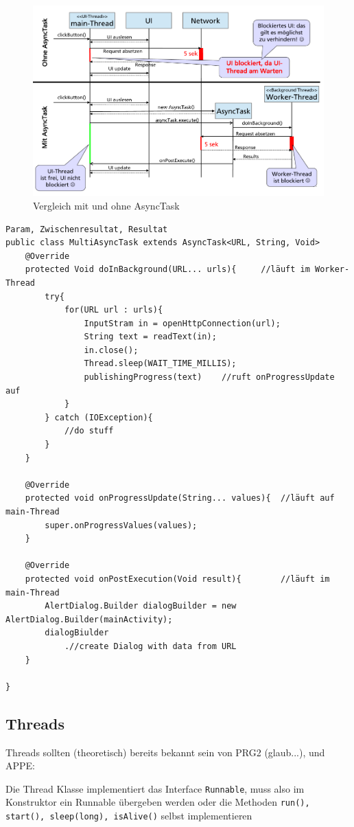 \documentclass[a4paper, 11pt]{article}
\newcommand{\code}[1]{\texttt{#1}}
\begin{document}
\begin{figure}[htb]
	\centering
	\includegraphics[keepaspectratio=true,height=15\baselineskip]{asynctask}
	\caption{Vergleich mit und ohne AsyncTask}
	\label{fig:asynctask}
\end{figure}

\begin{lstlisting}[caption={}]
														Param, Zwischenresultat, Resultat
public class MultiAsyncTask extends AsyncTask<URL, String, Void>
	@Override
	protected Void doInBackground(URL... urls){		//läuft im Worker-Thread
		try{
			for(URL url : urls){
				InputStram in = openHttpConnection(url);
				String text = readText(in);
				in.close();
				Thread.sleep(WAIT_TIME_MILLIS);
				publishingProgress(text)	//ruft onProgressUpdate auf
			}
		} catch (IOException){
			//do stuff
		}
	}
	
	@Override
	protected void onProgressUpdate(String... values){	//läuft auf main-Thread
		super.onProgressValues(values);
	}
	
	@Override
	protected void onPostExecution(Void result){		//läuft im main-Thread
		AlertDialog.Builder dialogBuilder = new AlertDialog.Builder(mainActivity);
		dialogBiulder
			.//create Dialog with data from URL
	}
	
}
\end{lstlisting}

\subsection{Threads}
Threads sollten (theoretisch) bereits bekannt sein von PRG2 (glaub...), und APPE:
\vspace{10px}

\noindent Die Thread Klasse implementiert das Interface \code{Runnable}, muss also im Konstruktor ein Runnable übergeben werden oder die Methoden \code{run(), start(), sleep(long), isAlive()} selbst implementieren
\end{document}
